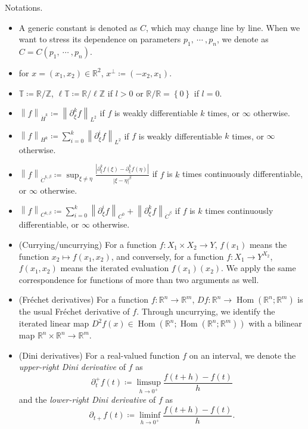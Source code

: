 \documentclass[reqno,centertags,12pt]{amsart}
\theoremstyle{definition}
\numberwithin{equation}{section}
\newcommand{\abs}[1]{\left\lvert#1\right\rvert}
\newcommand{\norm}[1]{\left\|#1\right\|}
\newcommand{\set}[1]{\left\{ #1 \right\}}
\newcommand{\bbR}{{\mathbb{R}}}
\newcommand{\bbZ}{{\mathbb{Z}}}
\newcommand{\bbT}{{\mathbb{T}}}
\begin{document}
Notations.
\begin{itemize}
    \item A generic constant is denoted as $C$, which may change line by line.
    When we want to stress its dependence on parameters $p_{1},\ \cdots\ ,p_{n}$,
    we denote as $C = C(p_{1},\ \cdots\ ,p_{n})$.

    \item for $x=(x_{1},x_{2})\in\bbR^{2}$, $x^{\perp}\coloneqq (-x_{2},x_{1})$.

    \item $\bbT\coloneqq\bbR/\bbZ$, $\ell\bbT\coloneqq\bbR/\ell\bbZ$ if
    $l>0$ or $\bbR/\bbR=\set{0}$ if $l=0$.

    \item $\norm{f}_{\dot{H}^{k}} \coloneqq \norm{\partial_{\xi}^{k}f}_{L^{2}}$
    if $f$ is weakly differentiable $k$ times, or $\infty$ otherwise.

    \item $\norm{f}_{H^{k}} \coloneqq \sum_{i=0}^{k}\norm{\partial_{\xi}^{i}f}_{L^{2}}$
    if $f$ is weakly differentiable $k$ times, or $\infty$ otherwise.

    \item $\norm{f}_{\dot{C}^{k,\beta}} \coloneqq \sup_{\xi\neq\eta}
    \frac{\abs{\partial_{\xi}^{k}f(\xi) - \partial_{\xi}^{k}f(\eta)}}
    {\abs{\xi - \eta}^{\beta}}$ if $f$ is $k$ times continuously differentiable,
    or $\infty$ otherwise.

    \item $\norm{f}_{C^{k,\beta}} \coloneqq
    \sum_{i=0}^{k}\norm{\partial_{\xi}^{i}f}_{C^{0}}
    + \norm{\partial_{\xi}^{k}f}_{\dot{C}^{\beta}}$
    if $f$ is $k$ times continuously differentiable, or $\infty$ otherwise.

    \item (Currying/uncurrying) For a function $f\colon X_{1}\times X_{2}\to Y$,
    $f(x_{1})$ means the function $x_{2}\mapsto f(x_{1},x_{2})$, and conversely,
    for a function $f\colon X_{1}\to Y^{X_{2}}$,
    $f(x_{1},x_{2})$ means the iterated evaluation $f(x_{1})(x_{2})$.
    We apply the same correspondence for functions of more than two arguments as well.

    \item (Fr\'{e}chet derivatives) For a function $f\colon\bbR^{n}\to\bbR^{m}$,
    $Df\colon \bbR^{n} \to \operatorname{Hom}(\bbR^{n};\bbR^{m})$ is the usual
    Fr\'{e}chet derivative of $f$. Through uncurrying, we identify the iterated linear map
    $D^{2}f(x)\in\operatorname{Hom}(\bbR^{n};\operatorname{Hom}(\bbR^{n};\bbR^{m}))$
    with a bilinear map $\bbR^{n}\times\bbR^{n}\to\bbR^{m}$.

    \item (Dini derivatives) For a real-valued function $f$ on an interval, we denote the
    \emph{upper-right Dini derivative} of $f$ as
    \[
        \partial_{t}^{+}f(t)\coloneqq \limsup_{h\to 0^{+}}\frac{f(t+h) - f(t)}{h}
    \]
    and the \emph{lower-right Dini derivative} of $f$ as
    \[
        \partial_{t+}f(t)\coloneqq \liminf_{h\to 0^{+}}\frac{f(t+h) - f(t)}{h}.
    \]
\end{itemize}
\end{document}
